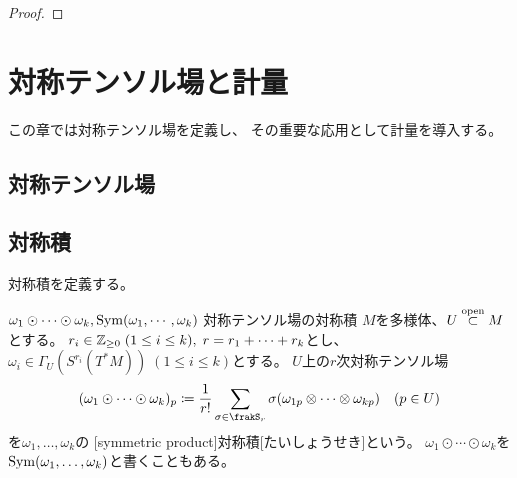 \documentclass[report]{jlreq}
\begin{document}
\begin{proof}
    \TODO{}
\end{proof}

\begin{definition}[フローに関する不変性]
    \TODO{}
\end{definition}



%
\newpage
\chapter{対称テンソル場と計量}

この章では対称テンソル場を定義し、
その重要な応用として計量を導入する。

%
\section{対称テンソル場}

\begin{definition}[対称テンソル場]
\end{definition}

%
\section{対称積}

対称積を定義する。

\begin{definition}[対称テンソル場の対称積]
        {$\omega_1 \odot \cdots \odot \omega_k, \operatorname{Sym}(\omega_1, \cdots, \omega_k)$}
        {対称テンソル場の対称積}
    $M$を多様体、$U \stackrel{\text{open}}{\subset} M$とする。
    $r_i \in \mathbb{Z}_{\ge 0} \; (1 \le i \le k), \; r = r_1 + \dots + r_k$とし、
    $\omega_i \in \Gamma_U(S^{r_i}(T^*M)) \; (1 \le i \le k)$とする。
    $U$上の$r$次対称テンソル場
    \begin{equation}
        (\omega_1 \odot \cdots \odot \omega_k)_p
            \coloneqq \frac{1}{r!}
            \sum_{\sigma \in \frakS_r}
            \sigma(\omega_{1p} \otimes \cdots \otimes \omega_{kp})
            \quad (p \in U)
    \end{equation}
    を$\omega_1, \dots, \omega_k$の
    [symmetric product]{対称積}[たいしょうせき]という。
    $\omega_1 \odot \cdots \odot \omega_k$を
    $\operatorname{Sym}(\omega_1, \dots, \omega_k)$と書くこともある。
\end{definition}
\end{document}
